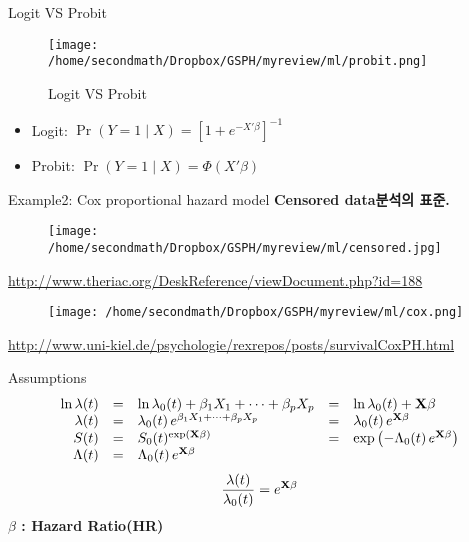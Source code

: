 \documentclass{beamer}
\begin{document}
\begin{frame}{Logit VS Probit}
\begin{figure}
\texttt{[image: /home/secondmath/Dropbox/GSPH/myreview/ml/probit.png]}
\caption{Logit VS Probit}
\end{figure}
\begin{itemize}
\item Logit: $\Pr(Y=1 \mid X) = [1 + e^{-X'\beta}]^{-1}$
\item Probit: $\Pr(Y=1 \mid X) = \Phi(X'\beta)$
\end{itemize}
\end{frame}





\begin{frame}{Example2: Cox proportional hazard model}
\textbf{Censored data분석의 표준.}
\begin{figure}
\texttt{[image: /home/secondmath/Dropbox/GSPH/myreview/ml/censored.jpg]}
\end{figure}
\url{http://www.theriac.org/DeskReference/viewDocument.php?id=188}
\end{frame}


\begin{frame}
\begin{figure}
\texttt{[image: /home/secondmath/Dropbox/GSPH/myreview/ml/cox.png]}
\end{figure}
\url{http://www.uni-kiel.de/psychologie/rexrepos/posts/survivalCoxPH.html}
\end{frame}

\begin{frame}{Assumptions}
\begin{equation*}
\begin{array}{rclcl}
\ln \lambda(t) &=& \ln \lambda_{0}(t) + \beta_{1} X_{1} + \dots + \beta_{p} X_{p}      &=& \ln \lambda_{0}(t) + \bf{X} \bf{\beta}\\
    \lambda(t) &=&     \lambda_{0}(t) \, e^{\beta_{1} X_{1} + \dots + \beta_{p} X_{p}} &=& \lambda_{0}(t) \, e^{\bf{X} \bf{\beta}}\\
S(t)           &=& S_{0}(t)^{\exp(\bf{X} \bf{\beta})} &=& \exp\left(-\Lambda_{0}(t) \, e^{\bf{X} \bf{\beta}}\right)\\
\Lambda(t)     &=& \Lambda_{0}(t) \, e^{\bf{X} \bf{\beta}} & &
\end{array}
\end{equation*}
\begin{equation*}
\frac{\lambda(t)}{\lambda_{0}(t)}=e^{\bf{X} \bf{\beta}}
\end{equation*}
\bf{$\beta$} : \textbf{Hazard Ratio(HR)}
\end{frame}
\end{document}
